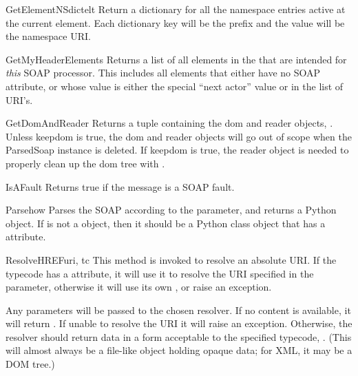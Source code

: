 \begin{methoddesc}{GetElementNSdict}{elt}
Return a dictionary for all the namespace entries active at the
current element. Each dictionary key will be the prefix and the value will
be the namespace URI.
\end{methoddesc}

\begin{methoddesc}{GetMyHeaderElements}{}
Returns a list of all elements in the  that are intended for
\emph{this} SOAP processor.
This includes all elements that either have no SOAP 
attribute, or whose value is either the special ``next actor'' value or
in the  list of URI's.
\end{methoddesc}

\begin{methoddesc}{GetDomAndReader}{}
Returns a tuple containing the dom and reader objects, .
Unless keepdom is true, the dom and reader objects will go out of scope
when the ParsedSoap instance is deleted. If keepdom is true, the reader
object is needed to properly clean up the dom tree with 
.
\end{methoddesc}

\begin{methoddesc}{IsAFault}{}
Returns true if the message is a SOAP fault.
\end{methoddesc}

\begin{methoddesc}{Parse}{how}
Parses the SOAP  according to the  parameter,
and returns a Python object.
If  is not a  object, then it should be a
Python class object that has a  attribute.
\end{methoddesc}

\begin{methoddesc}{ResolveHREF}{uri, tc}
This method is invoked to resolve an absolute URI.
If the typecode  has a  attribute, it will use it
to resolve the URI specified in the  parameter,
otherwise it will use its own , or raise an
 exception.

Any  parameters will be passed to the chosen resolver.
If no content is available, it will return .
If unable to resolve the URI it will raise an
 exception.
Otherwise, the resolver should return data in a form acceptable to the
specified typecode, .
(This will almost always be a file-like object holding opaque data;
for XML, it may be a DOM tree.)
\end{methoddesc}


